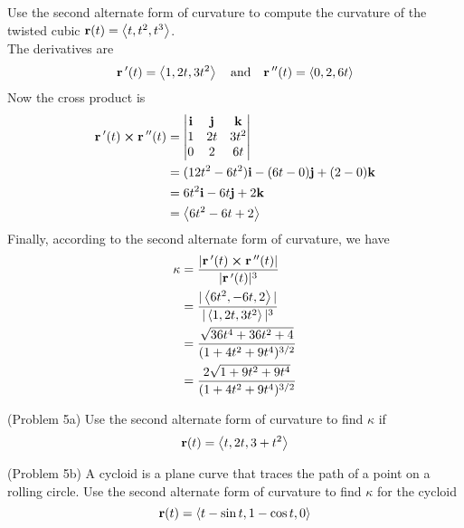 \documentclass[handout]{ximera}
\begin{document}
\begin{example}[Example 5]
Use the second alternate form of curvature to compute the curvature of the twisted cubic $\mathbf r(t) = \left\langle t, t^2, t^3\right\rangle$.\\
The derivatives are
\[
\mathbf r\,'(t) = \left\langle 1, 2t, 3t^2\right\rangle \quad \text{and} \quad \mathbf r\,''(t) = \left\langle 0, 2, 6t\right\rangle
\]
Now the cross product is
 \begin{align*}
 \mathbf  r\,'(t) \boldsymbol\times \mathbf r\,''(t) &= 
 \begin{vmatrix}
\mathbf{i} & \mathbf{j} & \mathbf{k}\\
1 & 2t & 3t^2\\
0 & 2 & 6t
\end{vmatrix}\\
&= (12t^2 - 6t^2) \mathbf{i} - (6t - 0) \mathbf{j} + (2-0) \mathbf{k}\\
 &=6t^2 \mathbf{i} -6t \mathbf{j} + 2 \mathbf{k}\\
 &=\left\langle 6t^2 - 6t +2\right\rangle
 \end{align*}
Finally, according to the second alternate form of curvature, we have
\begin{align*}
\kappa &=  \frac{|\mathbf r\,'(t) \boldsymbol\times \mathbf r\,''(t)|}{|\mathbf r\,'(t)|^3}\\
       &=  \frac{|\left\langle 6t^2,  -6t, 2\right\rangle|}{|\left\langle 1, 2t, 3t^2\right\rangle|^3}\\
       &= \frac{\sqrt{36t^4 + 36t^2 + 4}}{(1 + 4t^2 + 9t^4)^{3/2}}\\
       &= \frac{2\sqrt{1 + 9t^2 + 9t^4}}{(1 + 4t^2 + 9t^4)^{3/2}}
\end{align*}
\end{example}

\begin{problem}(Problem 5a)
Use the second alternate form of curvature to find $\kappa$ if 
\[
\mathbf r(t) = \left\langle t, 2t, 3+t^2\right\rangle
\]

\begin{multipleChoice}
\end{multipleChoice}

\end{problem}

\begin{problem}(Problem 5b)
A cycloid is a plane curve that traces the path of a point on a rolling circle.
Use the second alternate form of curvature to find $\kappa$ for the cycloid 
\[
\mathbf r(t) = \left\langle t - \sin t, 1 - \cos t, 0\right\rangle
\]

\begin{multipleChoice}
\end{multipleChoice}

\end{problem}
\end{document}
